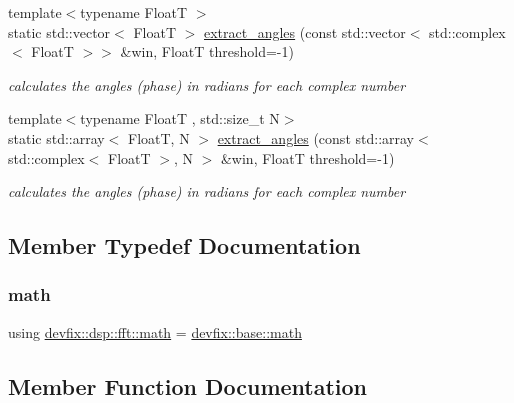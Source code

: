 \begin{DoxyCompactItemize}
{\footnotesize template$<$typename FloatT $>$ }\\static std\+::vector$<$ FloatT $>$ \hyperlink{structdevfix_1_1dsp_1_1fft_a7f34943ae3b66b6cf77b397f1a1c2386}{extract\+\_\+angles} (const std\+::vector$<$ std\+::complex$<$ FloatT $>$$>$ \&win, FloatT threshold=-\/1)
\begin{DoxyCompactList}\small\item\em calculates the angles (phase) in radians for each complex number \end{DoxyCompactList}\item 
{\footnotesize template$<$typename FloatT , std\+::size\+\_\+t N$>$ }\\static std\+::array$<$ FloatT, N $>$ \hyperlink{structdevfix_1_1dsp_1_1fft_a34854b817edfebadae41362b399c7f34}{extract\+\_\+angles} (const std\+::array$<$ std\+::complex$<$ FloatT $>$, N $>$ \&win, FloatT threshold=-\/1)
\begin{DoxyCompactList}\small\item\em calculates the angles (phase) in radians for each complex number \end{DoxyCompactList}\end{DoxyCompactItemize}


\subsection{Member Typedef Documentation}
\mbox{\label{structdevfix_1_1dsp_1_1fft_a466499f45d4ae1240f5ba7e8c44a4691}} 
\subsubsection{\texorpdfstring{math}{math}}
{\footnotesize\ttfamily using \hyperlink{structdevfix_1_1dsp_1_1fft_a466499f45d4ae1240f5ba7e8c44a4691}{devfix\+::dsp\+::fft\+::math} =  \hyperlink{structdevfix_1_1base_1_1math}{devfix\+::base\+::math}}



\subsection{Member Function Documentation}
\mbox{\label{structdevfix_1_1dsp_1_1fft_af29ead88d72ee8c63bb776e46b107d64}} 
